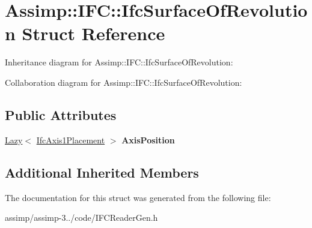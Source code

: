 \hypertarget{struct_assimp_1_1_i_f_c_1_1_ifc_surface_of_revolution}{\section{Assimp\+:\+:I\+F\+C\+:\+:Ifc\+Surface\+Of\+Revolution Struct Reference}
\label{struct_assimp_1_1_i_f_c_1_1_ifc_surface_of_revolution}
}


Inheritance diagram for Assimp\+:\+:I\+F\+C\+:\+:Ifc\+Surface\+Of\+Revolution\+:


Collaboration diagram for Assimp\+:\+:I\+F\+C\+:\+:Ifc\+Surface\+Of\+Revolution\+:
\subsection*{Public Attributes}
\begin{DoxyCompactItemize}
\item 
\hypertarget{struct_assimp_1_1_i_f_c_1_1_ifc_surface_of_revolution_afc7e3ec661f622d2eae44f9343c38cd1}{\hyperlink{struct_assimp_1_1_s_t_e_p_1_1_lazy}{Lazy}$<$ \hyperlink{struct_assimp_1_1_i_f_c_1_1_ifc_axis1_placement}{Ifc\+Axis1\+Placement} $>$ {\bfseries Axis\+Position}}\label{struct_assimp_1_1_i_f_c_1_1_ifc_surface_of_revolution_afc7e3ec661f622d2eae44f9343c38cd1}

\end{DoxyCompactItemize}
\subsection*{Additional Inherited Members}


The documentation for this struct was generated from the following file\+:\begin{DoxyCompactItemize}
\item 
assimp/assimp-\/3../code/I\+F\+C\+Reader\+Gen.\+h\end{DoxyCompactItemize}

